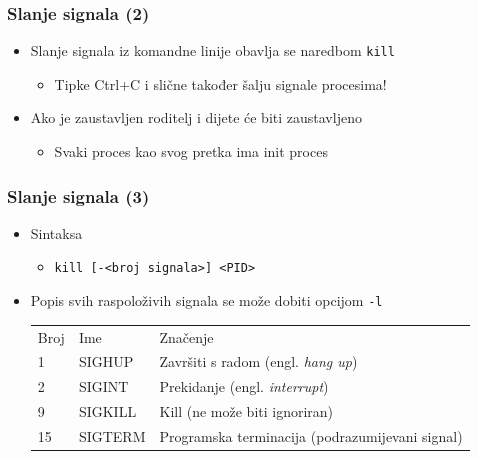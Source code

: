 \documentclass[table,usenames,dvipsnames]{beamer}
\newcommand{\shell}[1]{\texttt{#1}}
\begin{document}
\begin{frame}[t]
\frametitle{Slanje signala (2)}
\begin{itemize}
  \item Slanje signala iz komandne linije obavlja se naredbom \shell{kill}
  \begin{itemize}
    \item Tipke Ctrl+C i slične također šalju signale procesima!
  \end{itemize}
  \item Ako je zaustavljen roditelj i dijete će biti zaustavljeno
  \begin{itemize}
    \item Svaki proces kao svog pretka ima init proces
  \end{itemize}
\end{itemize}
\end{frame}

\begin{frame}[t]
\frametitle{Slanje signala (3)}
\begin{itemize}
  \item Sintaksa
  \begin{itemize}
    \item[] \shell{kill [-<broj signala>] <PID>}
  \end{itemize}
  \item Popis svih raspoloživih signala se može dobiti opcijom \shell{-l}
  \begin{table}[h]
  \begin{tabular}{l l l}
    \rowcolor{BlueViolet!20}Broj  & Ime & Značenje  \\
    1   & SIGHUP  & Završiti s radom (engl. \emph{hang up}) \\
    2   & SIGINT  & Prekidanje (engl. \emph{interrupt}) \\
    9   & SIGKILL & Kill (ne može biti ignoriran) \\
    15  & SIGTERM & Programska terminacija (podrazumijevani signal)
  \end{tabular}
  \end{table}
\end{itemize}
\end{frame} 
\end{document}
